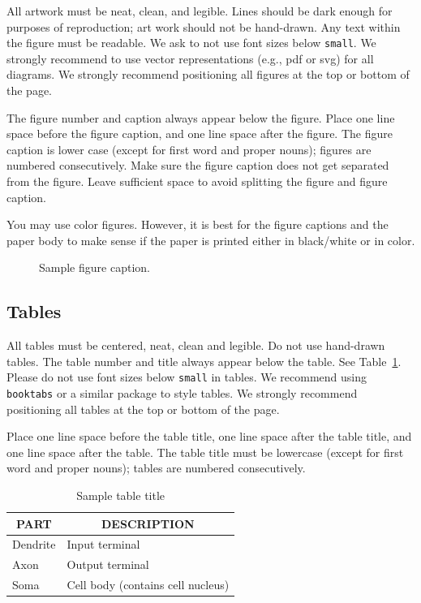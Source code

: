 \documentclass{article} %
\begin{document}
All artwork must be neat, clean, and legible. Lines should be dark
enough for purposes of reproduction; art work should not be
hand-drawn. Any text within the figure must be readable. We ask to not use font sizes below {\tt small}. We strongly recommend to use vector representations (e.g., pdf or svg) for all diagrams. 
We strongly recommend positioning all figures at the top or bottom of the page.

The figure number and caption always appear below the figure. Place one line space before the figure caption, and one line space after the figure. The figure caption is lower case (except for first word and proper nouns); figures are numbered consecutively.
Make sure the figure caption does not get separated from the figure.
Leave sufficient space to avoid splitting the figure and figure caption.

You may use color figures.
However, it is best for the
figure captions and the paper body to make sense if the paper is printed
either in black/white or in color.
\begin{figure}[t]
\begin{center}
\fbox{\rule[-.5cm]{0cm}{4cm} \rule[-.5cm]{4cm}{0cm}}
\end{center}
\caption{Sample figure caption.}
\end{figure}

\subsection{Tables}

All tables must be centered, neat, clean and legible. Do not use hand-drawn tables. The table number and title always appear below the table. See Table~\ref{sample-table}. Please do not use font sizes below {\tt small} in tables. We recommend using {\tt booktabs} or a similar package to style tables. 
We strongly recommend positioning all tables at the top or bottom of the page.

Place one line space before the table title, one line space after the table title, and one line space after the table. The table title must be lowercase (except for first word and proper nouns); tables are numbered consecutively.

\begin{table}[t]
\begin{center}
\begin{tabular}{ll}
\toprule
\multicolumn{1}{c}{\bf PART}  &\multicolumn{1}{c}{\bf DESCRIPTION} \\
\midrule
Dendrite         &Input terminal \\
Axon             &Output terminal \\
Soma             &Cell body (contains cell nucleus) \\
\bottomrule
\end{tabular}
\end{center}
\caption{Sample table title}\label{sample-table}
\end{table}
\end{document}
